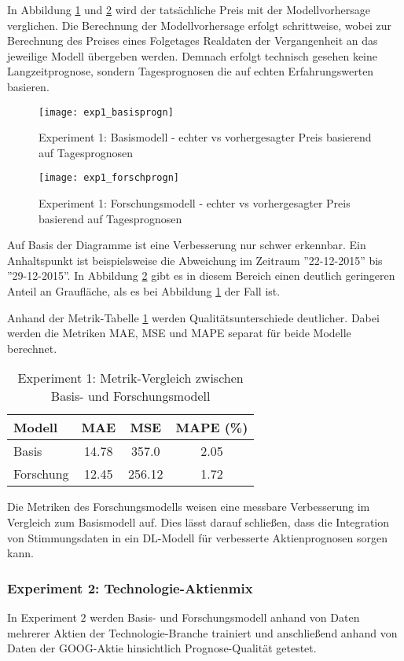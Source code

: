 In Abbildung \ref{fig:exp1_basisprogn} und \ref{fig:exp1_forschprogn} wird der tatsächliche Preis mit der Modellvorhersage verglichen. Die Berechnung der Modellvorhersage erfolgt schrittweise, wobei zur Berechnung des Preises eines Folgetages Realdaten der Vergangenheit an das jeweilige Modell übergeben werden. Demnach erfolgt technisch gesehen keine Langzeitprognose, sondern Tagesprognosen die auf echten Erfahrungswerten basieren.
\begin{figure}[H]
	\texttt{[image: exp1\_basisprogn]}
	\caption{Experiment 1: Basismodell - echter vs vorhergesagter Preis basierend auf Tagesprognosen}
	\label{fig:exp1_basisprogn}
\end{figure}
\begin{figure}[H]
	\texttt{[image: exp1\_forschprogn]}
	\caption{Experiment 1: Forschungsmodell - echter vs vorhergesagter Preis basierend auf Tagesprognosen}
	\label{fig:exp1_forschprogn}
\end{figure}
Auf Basis der Diagramme ist eine Verbesserung nur schwer erkennbar. Ein Anhaltspunkt ist beispielsweise die Abweichung im Zeitraum ''22-12-2015'' bis ''29-12-2015''. In Abbildung \ref{fig:exp1_forschprogn} gibt es in diesem Bereich einen deutlich geringeren Anteil an Graufläche, als es bei Abbildung \ref{fig:exp1_basisprogn} der Fall ist.

Anhand der Metrik-Tabelle \ref{tbl:exp1_model_metrics} werden Qualitätsunterschiede deutlicher. Dabei werden die Metriken \ac{MAE}, \ac{MSE} und \ac{MAPE} separat für beide Modelle berechnet.
\begin{table}[H]
	\centering
	\caption{Experiment 1: Metrik-Vergleich zwischen Basis- und Forschungsmodell}
	\label{tbl:exp1_model_metrics}
	\begin{tabular}{lccc}
		\hline
		\textbf{Modell} & \textbf{MAE} & \textbf{MSE} & \textbf{MAPE (\%)} \\
		\hline
		Basis & 14.78 & 357.0 & 2.05 \\
		Forschung & 12.45 & 256.12 & 1.72 \\
		\hline
	\end{tabular}
\end{table}
Die Metriken des Forschungsmodells weisen eine messbare Verbesserung im Vergleich zum Basismodell auf. Dies lässt darauf schließen, dass die Integration von Stimmungsdaten in ein \ac{DL}-Modell für verbesserte Aktienprognosen sorgen kann.

\subsubsection{Experiment 2: Technologie-Aktienmix}\label{sec:evaluierung_exp2}
In Experiment $2$ werden Basis- und Forschungsmodell anhand von Daten mehrerer Aktien der Technologie-Branche trainiert und anschließend anhand von Daten der GOOG-Aktie hinsichtlich Prognose-Qualität getestet.

